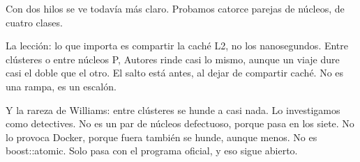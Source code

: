 Con dos hilos se ve todavía más claro. Probamos catorce parejas de núcleos, de cuatro clases.

La lección: lo que importa es compartir la caché L2, no los nanosegundos. Entre clústeres o entre núcleos P, Autores rinde casi lo mismo, aunque un viaje dure casi el doble que el otro. El salto está antes, al dejar de compartir caché. No es una rampa, es un escalón.

Y la rareza de Williams: entre clústeres se hunde a casi nada. Lo investigamos como detectives. No es un par de núcleos defectuoso, porque pasa en los siete. No lo provoca Docker, porque fuera también se hunde, aunque menos. No es boost::atomic. Solo pasa con el programa oficial, y eso sigue abierto.

